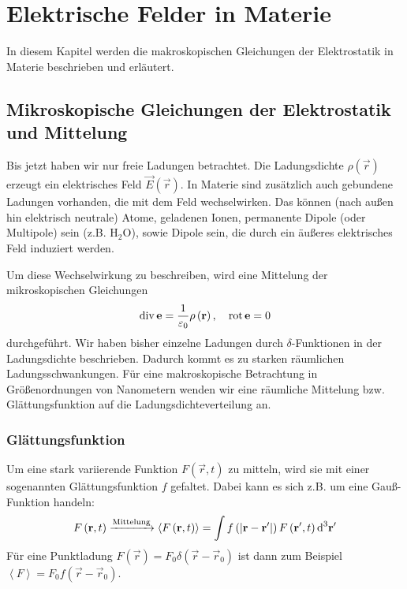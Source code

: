 

\chapter{Elektrische Felder in Materie}

In diesem Kapitel werden die makroskopischen Gleichungen der Elektrostatik in Materie beschrieben und erläutert.

\section{Mikroskopische Gleichungen der Elektrostatik und Mittelung}

Bis jetzt haben wir nur freie Ladungen betrachtet. Die Ladungsdichte $\rho \left(\vec {r}\right)$ erzeugt ein elektrisches Feld $\vec {E}(\vec r)$. In Materie sind zusätzlich auch gebundene Ladungen vorhanden, die mit dem Feld wechselwirken. Das können (nach außen hin elektrisch neutrale) Atome, geladenen Ionen, permanente Dipole (oder Multipole) sein (z.B. $\mathrm{H}_{2}\mathrm{O}$), sowie Dipole sein, die durch ein äußeres elektrisches Feld induziert werden.

Um diese Wechselwirkung zu beschreiben, wird eine Mittelung der mikroskopischen Gleichungen
\begin{equation*}
	\operatorname{div} \mathbf{e}=\frac{1}{\varepsilon _{0}}\rho \left(\mathbf{r}\right),\quad \operatorname{rot} \mathbf{e}=0
\end{equation*}
durchgeführt. Wir haben bisher einzelne Ladungen durch $\delta $-Funktionen in der Ladungsdichte beschrieben. Dadurch kommt es zu starken räumlichen Ladungsschwankungen. Für eine makroskopische Betrachtung in Größenordnungen von Nanometern wenden wir eine räumliche Mittelung bzw. Glättungsfunktion auf die Ladungsdichteverteilung an.


\subsection{Glättungsfunktion}

Um eine stark variierende Funktion $F\left(\vec {r},t\right)$ zu mitteln, wird sie mit einer sogenannten Glättungsfunktion $f$ gefaltet. Dabei kann es sich z.B. um eine Gauß-Funktion handeln:
\begin{equation*}
	F\left(\mathbf{r},t\right) \xrightarrow{\text{Mittelung}} \left\langle F\left(\mathbf{r},t\right)\right\rangle =\int f\left(\left| \mathbf{r}-\mathbf{r}'\right| \right)F\left(\mathbf{r}',t\right)\text{d} ^{3}\mathbf{r}'
\end{equation*}
Für eine Punktladung $F\left(\vec {r}\right)=F_{0}\delta \left(\vec {r}-\vec {r}_{0}\right)$ ist dann zum Beispiel $\left\langle F\right\rangle =F_{0}f\left(\vec {r}-\vec {r}_{0}\right)$.

